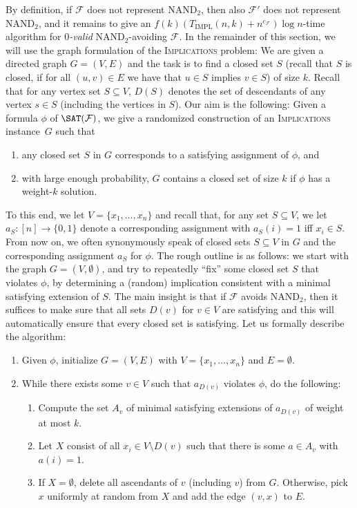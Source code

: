 \documentclass[10pt,a4paper]{article}
\theoremstyle{plain}
\newcommand{\NAND}{\mathrm{NAND}}
\newcommand{\Impl}{\mathrm{IMPL}}
\newcommand{\confam}{\mathcal{F}}
\newcommand{\Implication}{\textsc{Implications}\xspace}
\begin{document}
\noindent 
By definition, if $\confam$ does not represent $\NAND_2$, then also $\confam'$ does not represent $\NAND_2$, and it remains to give an $f(k)(T_\Impl(n,k) + n^{c_\confam})\log n$-time algorithm for \emph{$0$-valid} $\NAND_2$-avoiding $\confam$.  
%
In the remainder of this section, we will use the graph formulation of the \Implication problem: We are given a directed graph $G=(V,E)$ and the task is to find a closed set $S$ (recall that $S$ is closed, if for all $(u,v)\in E$ we have that $u\in S$ implies $v\in S$) of size $k$. Recall that for any vertex set $S\subseteq V$, $D(S)$ denotes the set of descendants of any vertex $s \in S$ (including the vertices in $S$).
%
Our aim is the following: Given a formula $\phi$ of $\SAT(\confam)$, we give a randomized construction of an \Implication instance~$G$ such that 
\begin{enumerate}[label=(\roman*),nosep]
\item any closed set $S$ in $G$ corresponds to a satisfying assignment of $\phi$, and 
\item with large enough probability, $G$ contains a closed set of size $k$ if $\phi$ has a weight-$k$ solution.
\end{enumerate}
To this end, we let $V=\{x_1, \dots, x_n\}$ and recall that, for any set $S\subseteq V$, we let $a_S: [n]\to \{0,1\}$ denote a corresponding assignment with $a_S(i) = 1$ iff $x_i \in S$. From now on, we often synonymously speak of closed sets $S\subseteq V$ in $G$ and the corresponding assignment $a_S$ for $\phi$.
%
The rough outline is as follows: we start with the graph $G=(V,\emptyset)$, and try to repeatedly ``fix'' some closed set $S$ that violates $\phi$, by determining a (random) implication consistent with a minimal satisfying extension of $S$. The main insight is that if $\confam$ avoids $\NAND_2$, then it suffices to make sure that all sets $D(v)$ for $v\in V$ are satisfying and this will automatically ensure that every closed set is satisfying.
%
Let us formally describe the algorithm: 
\begin{enumerate}
\item Given $\phi$, initialize $G= (V,E)$ with $V=\{x_1,\dots, x_n\}$ and $E=\emptyset$.
\item While there exists some $v\in V$ such that $a_{D(v)}$ violates $\phi$, do the following:
\begin{enumerate}
\item Compute the set $A_v$ of minimal satisfying extensions of $a_{D(v)}$ of weight at most $k$.
\item Let $X$ consist of all $x_i \in V\setminus D(v)$ such that there is some $a\in A_v$ with $a(i) = 1$.
\item If $X = \emptyset$, delete all ascendants of $v$ (including $v$) from $G$. Otherwise, pick $x$ uniformly at random from $X$ and add the edge $(v,x)$ to $E$.
\end{enumerate}
\end{enumerate}
\end{document}
